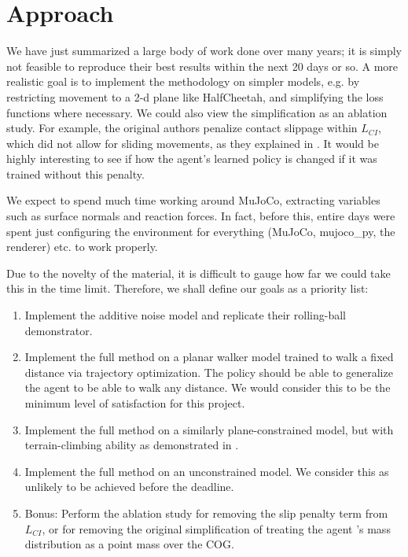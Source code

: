\documentclass{article}
\begin{document}
\section{Approach}

We have just summarized a large body of work done over many years; it is simply not feasible to reproduce their best results within the next 20 days or so. A more realistic goal is to implement the methodology on simpler models, e.g. by restricting movement to a 2-d plane like HalfCheetah, and simplifying the loss functions where necessary. We could also view the simplification as an ablation study. For example, the original authors penalize contact slippage within $L_{CI}$, which did not allow for sliding movements, as they explained in \cite{mordatch2012contact}. It would be highly interesting to see if how the agent's learned policy is changed if it was trained without this penalty.

We expect to spend much time working around MuJoCo, extracting variables such as surface normals and reaction forces. In fact, before this, entire days were spent just configuring the environment for everything (MuJoCo, mujoco\_py, the renderer) etc. to work properly.

Due to the novelty of the material, it is difficult to gauge how far we could take this in the time limit. Therefore, we shall define our goals as a priority list:
\begin{enumerate}
	\item Implement the additive noise model and replicate their rolling-ball demonstrator.
	\item Implement the full method on a planar walker model trained to walk a fixed distance via trajectory optimization. The policy should be able to generalize the agent to be able to walk any distance. We would consider this to be the minimum level of satisfaction for this project.
	\item Implement the full method on a similarly plane-constrained model, but with terrain-climbing ability as demonstrated in \cite{mordatch2012discovery}.
	\item Implement the full method on an unconstrained model. We consider this as unlikely to be achieved before the deadline.
	\item Bonus: Perform the ablation study for removing the slip penalty term from $L_{CI}$, or for removing the original simplification of treating the agent 's mass distribution as a point mass over the COG.
\end{enumerate}

\newpage





\end{document}
